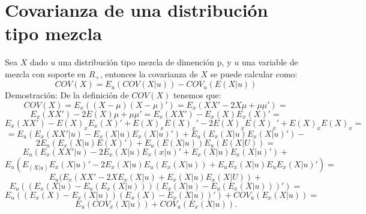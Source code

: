 \documentclass[11pt]{book}
\begin{document}
\section{Covarianza de una distribución tipo mezcla}
Sea $X$ dado $u$ una distribución tipo mezcla de dimención p, y $u$ una variable de mezcla con soporte
en $R_{+}$, entonces la covarianza de $X$ se puede calcular como:
\begin{equation*}
COV(X)=E_{u}(COV(X|u))-COV_{u}(E(X|u))
\end{equation*}
Demostración:
De la definición de $COV(X)$ tenemos que:
\begin{equation*}
COV(X)=E_{x}((X-\mu)(X-\mu)')=E_{x}(XX'-2X\mu+\mu\mu')=
\end{equation*}
\begin{equation*}
E_{x}(XX')-2E(X)\mu+\mu\mu'=E_{x}(XX')-E_{x}(X)E_{x}(X)'=
\end{equation*}
\begin{equation*}
E_{x}(XX')-E(X)_{x}E_{x}(X)'+E(X)_{x}E(X)_{x}'-2E(X)_{x}E(X)_{x}'+E(X)_{x}E(X)_{x}=
\end{equation*}
\begin{equation*}
=E_{u}(E_{x}(XX'|u)-E_{x}(X|u)E_{x}(X|u)')+E_{u}(E_{x}(X|u)E_{x}(X|u)')-
\end{equation*}
\begin{equation*}
2E_{u}(E_{x}(X|u)E(X)')+E_{u}(E(X|u))E_{u}(E(X|U))=
\end{equation*}
\begin{equation*}
E_{u}(E_{x}(XX'|u)-2E_{x}(X|u)E_{x}(x|u)'+E_{x}(X|u)E_{x}(X|u)') +
\end{equation*}
\begin{equation*}
E_{u}(E_(X|u)E_{x}(X|u)'-2E_{x}(X|u)E_{u}(E_{x}(X|u))+E_{u}E_{x}(X|u)E_{u}E_{x}(X|u)')=
\end{equation*}
\begin{equation*}
E_{u}(E_{x}(XX'-2XE_{x}(X|u)+E_{x}(X|u)E_{x}(X|U)) +
\end{equation*}
\begin{equation*}
E_{u}((E_{x}(X|u)-E_{u}(E_{x}(X|u)))(E_{x}(X|u)-E_{u}(E_{x}(X|u)))')=
\end{equation*}
\begin{equation*}
E_{u}((E_{x}(X)-E_{x}(X|u))(E_{x}(X)-E_{x}(X|u))') + COV_{u}(E_{x}(X|u))=
\end{equation*}
\begin{equation*}
E_{u}(COV_{x}(X|u)) + COV_{u}(E_{x}(X|u)).
\end{equation*}
\end{document}

